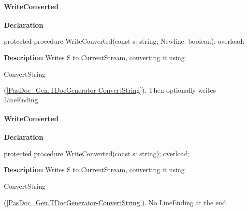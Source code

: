 \documentclass{report}
\newif\ifpdf
\begin{document}
\paragraph*{WriteConverted}\hspace*{\fill}

\label{PasDoc_Gen.TDocGenerator-WriteConverted}
\begin{list}{}{
\setlength{\itemindent}{0cm}
\setlength{\listparindent}{0cm}
\setlength{\leftmargin}{\evensidemargin}
\addtolength{\leftmargin}{\tmplength}
\settowidth{\labelsep}{X}
\addtolength{\leftmargin}{\labelsep}
\setlength{\labelwidth}{\tmplength}
}
\item[\textbf{Declaration}\hfill]
\ifpdf
\begin{flushleft}
\fi
\begin{ttfamily}
protected procedure WriteConverted(const s: string; Newline: boolean); overload;\end{ttfamily}

\ifpdf
\end{flushleft}
\fi

\par
\item[\textbf{Description}]
Writes S to CurrentStream, converting it using \begin{ttfamily}ConvertString\end{ttfamily}(\ref{PasDoc_Gen.TDocGenerator-ConvertString}). Then optionally writes LineEnding.

\end{list}
\paragraph*{WriteConverted}\hspace*{\fill}

\label{PasDoc_Gen.TDocGenerator-WriteConverted}
\begin{list}{}{
\setlength{\itemindent}{0cm}
\setlength{\listparindent}{0cm}
\setlength{\leftmargin}{\evensidemargin}
\addtolength{\leftmargin}{\tmplength}
\settowidth{\labelsep}{X}
\addtolength{\leftmargin}{\labelsep}
\setlength{\labelwidth}{\tmplength}
}
\item[\textbf{Declaration}\hfill]
\ifpdf
\begin{flushleft}
\fi
\begin{ttfamily}
protected procedure WriteConverted(const s: string); overload;\end{ttfamily}

\ifpdf
\end{flushleft}
\fi

\par
\item[\textbf{Description}]
Writes S to CurrentStream, converting it using \begin{ttfamily}ConvertString\end{ttfamily}(\ref{PasDoc_Gen.TDocGenerator-ConvertString}). No LineEnding at the end.

\end{list}
\end{document}
